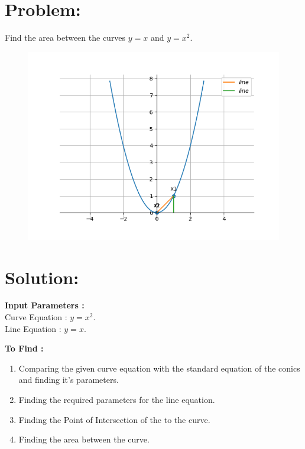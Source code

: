 \documentclass[10pt,a4paper]{report}
\begin{document}
\begin{multicols}{2}

\section{Problem:}  
\fi
Find the area between the curves $y=x$ and $y=x^2$.
\\
\solution
	\begin{figure}[!h]
		\centering
 \includegraphics[width=\columnwidth]{chapters/12/8/3/2/figs/figure.png}
		\caption{}
		\label{fig:12/8/3/2}
  	\end{figure}
\iffalse
\section{Solution: }
\raggedright \textbf{Input Parameters :}\\ \vspace{2mm}
\centering Curve Equation : $y=x^2$. \\ \vspace{1mm}
Line Equation : $y=x$.\\
\vspace{3mm}

\raggedright \textbf{To Find :}\\ \vspace{2mm}
\begin{enumerate}
\item Comparing the given curve equation with the standard equation of the conics and finding it's parameters.
\item Finding the required parameters for the line equation.
\item Finding the Point of Intersection of the to the curve.
\item Finding the area between the curve.
\end{enumerate}


\end{multicols}
\end{document}
